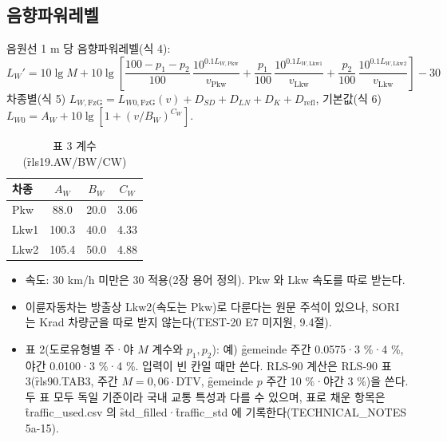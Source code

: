 \documentclass[10.5pt,a4paper]{article}
\begin{document}
\subsection{음향파워레벨}
음원선 1 m 당 음향파워레벨(식 4):
\begin{equation*}
L_W' = 10\lg M + 10\lg\!\left[\frac{100-p_1-p_2}{100}\,\frac{10^{0.1L_{W,\mathrm{Pkw}}}}{v_\mathrm{Pkw}} + \frac{p_1}{100}\,\frac{10^{0.1L_{W,\mathrm{Lkw1}}}}{v_\mathrm{Lkw}} + \frac{p_2}{100}\,\frac{10^{0.1L_{W,\mathrm{Lkw2}}}}{v_\mathrm{Lkw}}\right] - 30
\end{equation*}
차종별(식 5) $L_{W,\mathrm{FzG}} = L_{W0,\mathrm{FzG}}(v) + D_{SD} + D_{LN} + D_K + D_\mathrm{refl}$, 기본값(식 6) $L_{W0} = A_W + 10\lg[1 + (v/B_W)^{C_W}]$.

\begin{table}[h]\centering\small
\caption{표 3 계수(\f{rls19.AW/BW/CW})}\label{tab:t3}
\begin{tabular}{lccc}
\toprule
차종 & $A_W$ & $B_W$ & $C_W$ \\ \midrule
Pkw & 88.0 & 20.0 & 3.06 \\
Lkw1 & 100.3 & 40.0 & 4.33 \\
Lkw2 & 105.4 & 50.0 & 4.88 \\
\bottomrule
\end{tabular}
\end{table}

\begin{itemize}
\item 속도: 30 km/h 미만은 30 적용(2장 용어 정의). Pkw 와 Lkw 속도를 따로 받는다.
\item 이륜자동차는 방출상 Lkw2(속도는 Pkw)로 다룬다는 원문 주석이 있으나, SORI 는 Krad 차량군을 따로 받지 않는다(TEST-20 E7 미지원, 9.4절).
\item 표 2(도로유형별 주·야 $M$ 계수와 $p_1, p_2$): 예) \f{gemeinde} 주간 0.0575·3 \%·4 \%, 야간 0.0100·3 \%·4 \%. 입력이 빈 칸일 때만 쓴다. RLS-90 계산은 RLS-90 표 3(\f{rls90.TAB3}, 주간 $M = 0{,}06\cdot$DTV, \f{gemeinde} $p$ 주간 10 \%·야간 3 \%)을 쓴다. 두 표 모두 독일 기준이라 국내 교통 특성과 다를 수 있으며, 표로 채운 항목은 \f{traffic\_used.csv} 의 \f{std\_filled}·\f{traffic\_std} 에 기록한다(TECHNICAL\_NOTES 5a-15).
\end{itemize}
\end{document}
